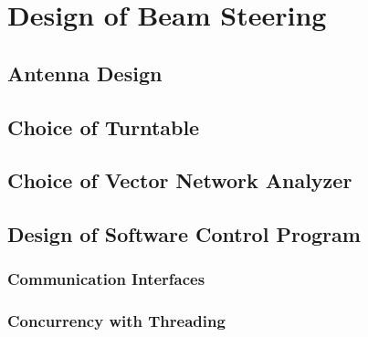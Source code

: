 \chapter{Design of Beam Steering} 

\section{Antenna Design}

\section{Choice of Turntable}

\section{Choice of Vector Network Analyzer}

\section{Design of Software Control Program}

\subsection{Communication Interfaces}

\subsection{Concurrency with Threading}
